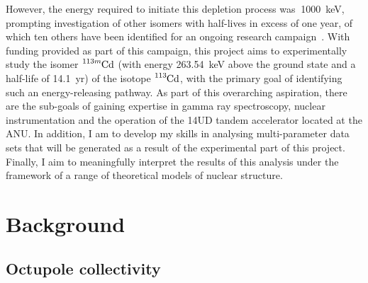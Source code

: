 \documentclass[12pt,a4paper]{article}
\begin{document}
\medskip
However, the energy required to initiate this depletion process was $~$1000~keV, prompting investigation of other isomers with half-lives in excess of one year, of which ten others have been identified for an ongoing research campaign~\cite{shaffer_innovations_2018}. %
With funding provided as part of this campaign, this project aims to experimentally study the isomer $\ce{^{113m}Cd}$ (with energy 263.54~keV above the ground state and a half-life of 14.1~yr) of the isotope $\ce{^{113}Cd}$, with the primary goal of identifying such an energy-releasing pathway. As part of this overarching aspiration, there are the sub-goals of gaining expertise in gamma ray spectroscopy, nuclear instrumentation and the operation of the 14UD tandem accelerator located at the ANU. In addition, I am to develop my skills in analysing multi-parameter data sets that will be generated as a result of the experimental part of this project. Finally, I aim to meaningfully interpret the results of this analysis under the framework of a range of theoretical models of nuclear structure.


\section*{Background}

\subsection*{Octupole collectivity}


\medskip
\end{document}
